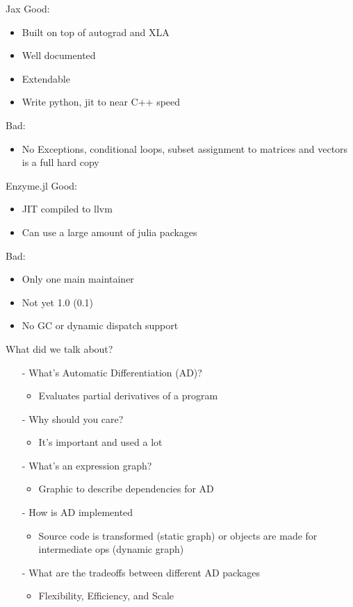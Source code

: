 \documentclass[dvipsnames]{beamer}
\begin{document}
\begin{frame}{Jax}
Good:
\begin{itemize}
    \item Built on top of autograd and XLA
    \item Well documented
    \item Extendable
    \item Write python, jit to near C++ speed
\end{itemize}
Bad:
\begin{itemize}
    \item No Exceptions, conditional loops, subset assignment to matrices and vectors is a full hard copy
\end{itemize}
\end{frame}

\begin{frame}{Enzyme.jl}
Good:
\begin{itemize}
    \item JIT compiled to llvm
    \item Can use a large amount of julia packages
\end{itemize}
Bad:
\begin{itemize}
    \item Only one main maintainer
    \item Not yet 1.0 (0.1)
    \item No GC or dynamic dispatch support
\end{itemize}
\end{frame}
\begin{frame}{What did we talk about?}
   \begin{itemize}
    \item[-] What's Automatic Differentiation (AD)?
    \begin{itemize}
        \item Evaluates partial derivatives of a program
    \end{itemize}
    \item[-] Why should you care?
    \begin{itemize}
        \item It's important and used a lot
    \end{itemize}
    \item[-] What's an expression graph?
    \begin{itemize}
        \item Graphic to describe dependencies for AD
    \end{itemize}
    \item[-] How is AD implemented
    \begin{itemize}
        \item Source code is transformed (static graph) or objects are made for intermediate ops (dynamic graph) 
    \end{itemize}
    \item[-] What are the tradeoffs between different AD packages
    \begin{itemize}
        \item Flexibility, Efficiency, and Scale
    \end{itemize}
   \end{itemize}
\end{frame}
\end{document}
